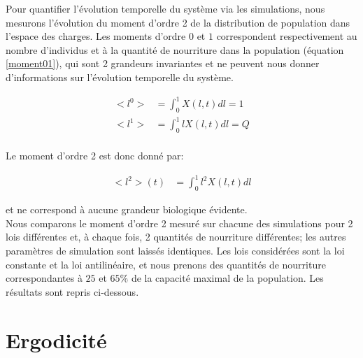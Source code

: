 Pour quantifier l'évolution temporelle du système via les simulations, nous mesurons l'évolution du moment d'ordre 2 de la distribution de population dans l'espace des charges. Les moments d'ordre $0$ et $1$ correspondent respectivement au nombre d'individus et à la quantité de nourriture dans la population (équation \ref{moment01}), qui sont 2 grandeurs invariantes et ne peuvent nous donner d'informations sur l'évolution temporelle du système.

\begin{equation}
\begin{aligned}
<l^0> &= \int_0^1 X(l,t) dl = 1\\
<l^1> &= \int_0^1 l X(l,t) dl = Q\\
\end{aligned}
\label{moment01}
\end{equation}

Le moment d'ordre 2 est donc donné par:

\begin{equation}
\begin{aligned}
<l^2>(t) &= \int_0^1 l^2 X(l,t) dl 
\end{aligned}
\label{moment2continu}
\end{equation}

et ne correspond à aucune grandeur biologique évidente.\\

Nous comparons le moment d'ordre 2 mesuré sur chacune des simulations pour 2 lois différentes et, à chaque fois, 2 quantités de nourriture différentes; les autres paramètres de simulation sont laissés identiques. Les lois considérées sont la loi constante et la loi antilinéaire, et nous prenons des quantités de nourriture correspondantes à $25$ et $65\%$ de la capacité maximal de la population. Les résultats sont repris ci-dessous. \fixme











\section{Ergodicité}

